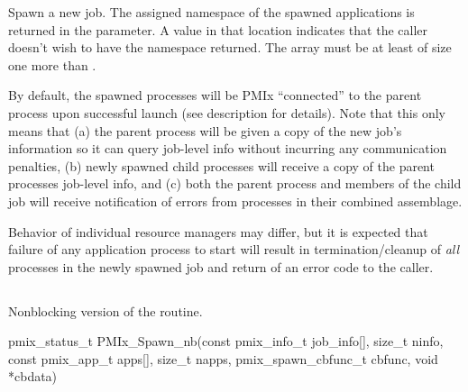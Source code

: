 \optattrend

\descr

Spawn a new job.
The assigned namespace of the spawned applications is returned in the  parameter.
A  value in that location indicates that the caller doesn't wish to have the namespace returned.
The  array must be at least of size one more than .

By default, the spawned processes will be PMIx ``connected'' to the parent process upon successful launch (see  description for details).
Note that this only means that (a) the parent process will be given a copy of the new job's
information so it can query job-level info without incurring any communication penalties, (b) newly spawned child processes will receive a copy of the parent processes job-level info, and (c) both the parent process and members of the child job will receive notification of errors from processes in their combined assemblage.

\adviceuserstart
Behavior of individual resource managers may differ, but it is expected that failure of any application process to start will result in termination/cleanup of \emph{all} processes in the newly spawned job and return of an error code to the caller.
\adviceuserend

\subsection{}

\summary

Nonblocking version of the  routine.

\format

\cspecificstart
\begin{codepar}
pmix_status_t
PMIx_Spawn_nb(const pmix_info_t job_info[], size_t ninfo,
              const pmix_app_t apps[], size_t napps,
              pmix_spawn_cbfunc_t cbfunc, void *cbdata)
\end{codepar}
\cspecificend

\begin{arglist}
\end{arglist}

